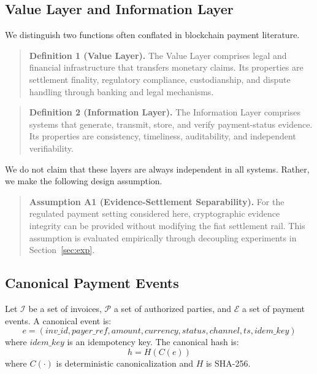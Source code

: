 \documentclass[journal]{IEEEtran}
\begin{document}
\subsection{Value Layer and Information Layer}
We distinguish two functions often conflated in blockchain payment literature.

\begin{quote}
\textbf{Definition 1 (Value Layer).} The Value Layer comprises legal and financial infrastructure that transfers monetary claims. Its properties are settlement finality, regulatory compliance, custodianship, and dispute handling through banking and legal mechanisms.
\end{quote}

\begin{quote}
\textbf{Definition 2 (Information Layer).} The Information Layer comprises systems that generate, transmit, store, and verify payment-status evidence. Its properties are consistency, timeliness, auditability, and independent verifiability.
\end{quote}

We do not claim that these layers are always independent in all systems. Rather, we make the following design assumption.

\begin{quote}
\textbf{Assumption A1 (Evidence-Settlement Separability).} For the regulated payment setting considered here, cryptographic evidence integrity can be provided without modifying the fiat settlement rail. This assumption is evaluated empirically through decoupling experiments in Section~\ref{sec:exp}.
\end{quote}

\subsection{Canonical Payment Events}
Let $\mathcal{I}$ be a set of invoices, $\mathcal{P}$ a set of authorized parties, and $\mathcal{E}$ a set of payment events. A canonical event is:
\begin{equation}
e = (\mathit{inv\_id}, \mathit{payer\_ref}, \mathit{amount}, \mathit{currency},
\mathit{status}, \mathit{channel}, \mathit{ts}, \mathit{idem\_key})
\end{equation}
where $\mathit{idem\_key}$ is an idempotency key. The canonical hash is:
\begin{equation}
h = H(C(e))
\end{equation}
where $C(\cdot)$ is deterministic canonicalization and $H$ is SHA-256.
\end{document}
